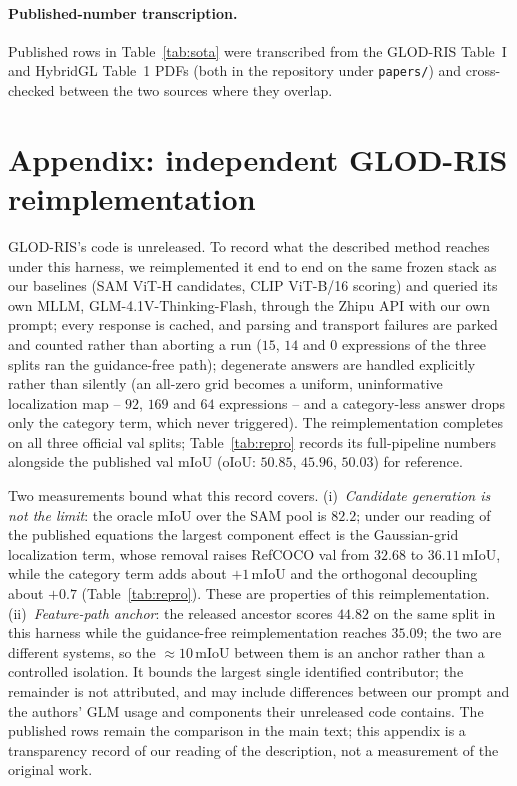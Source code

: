 \paragraph{Published-number transcription.}
Published rows in Table~\ref{tab:sota} were transcribed from the GLOD-RIS
Table~I and HybridGL Table~1 PDFs (both in the repository under
\texttt{papers/}) and cross-checked between the two sources where they
overlap.


\section{Appendix: independent GLOD-RIS reimplementation}
\label{app:repro}
GLOD-RIS's code is unreleased. To record what the described method reaches
under this harness, we reimplemented it end to end on the same frozen stack as
our baselines (SAM ViT-H candidates, CLIP ViT-B/16 scoring) and queried its
own MLLM, GLM-4.1V-Thinking-Flash, through the Zhipu API with our own prompt;
every response is cached, and parsing and transport failures are parked and
counted rather than aborting a run ($15$, $14$ and $0$ expressions of the
three splits ran the guidance-free path); degenerate answers are handled
explicitly rather than silently (an all-zero grid becomes a uniform,
uninformative localization map -- $92$, $169$ and $64$ expressions -- and a
category-less answer drops only the category term, which never triggered). The
reimplementation completes on all three official val splits;
Table~\ref{tab:repro} records its full-pipeline numbers alongside the
published val mIoU (oIoU: $50.85$, $45.96$, $50.03$) for reference.

Two measurements bound what this record covers.
(i)~\emph{Candidate generation is not the limit}: the oracle mIoU over the SAM
pool is $82.2$; under our reading of the published equations the largest
component effect is the Gaussian-grid localization term, whose removal raises
RefCOCO val from $32.68$ to $36.11$\,mIoU, while the category term adds about
$+1$\,mIoU and the orthogonal decoupling about $+0.7$
(Table~\ref{tab:repro}). These are properties of this reimplementation.
(ii)~\emph{Feature-path anchor}: the released ancestor scores $44.82$ on the
same split in this harness while the guidance-free reimplementation reaches
$35.09$; the two are different systems, so the $\approx\!10$\,mIoU between
them is an anchor rather than a controlled isolation. It bounds the largest
single identified contributor; the remainder is not attributed, and may
include differences between our prompt and the authors' GLM usage and
components their unreleased code contains. The published rows remain the
comparison in the main text; this appendix is a transparency record of our
reading of the description, not a measurement of the original work.

